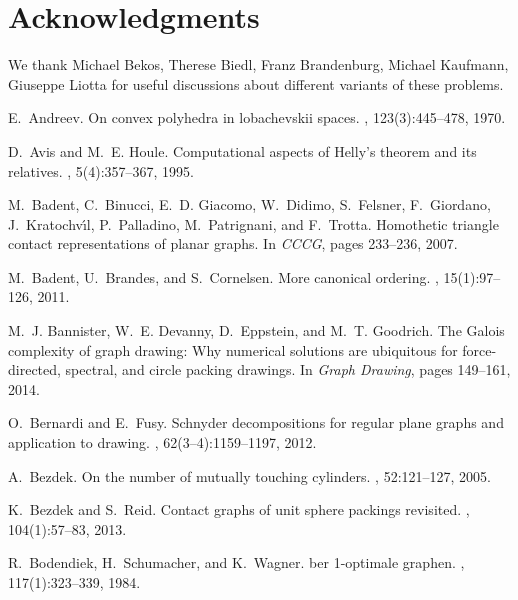 \documentclass{article}
\begin{document}
\section*{Acknowledgments}
We thank Michael Bekos, Therese Biedl, Franz Brandenburg, Michael Kaufmann, Giuseppe Liotta for useful discussions about different variants of these problems.





\begin{thebibliography}{10}

E.~Andreev.
\newblock On convex polyhedra in lobachevskii spaces.
, 123(3):445--478, 1970.

D.~Avis and M.~E. Houle.
\newblock Computational aspects of {H}elly's theorem and its relatives.
, 5(4):357--367, 1995.

M.~Badent, C.~Binucci, E.~D. Giacomo, W.~Didimo, S.~Felsner, F.~Giordano,
  J.~Kratochv{\'\i}l, P.~Palladino, M.~Patrignani, and F.~Trotta.
\newblock Homothetic triangle contact representations of planar graphs.
\newblock In {\em CCCG}, pages 233--236, 2007.

M.~Badent, U.~Brandes, and S.~Cornelsen.
\newblock More canonical ordering.
, 15(1):97--126,
  2011.

M.~J. Bannister, W.~E. Devanny, D.~Eppstein, and M.~T. Goodrich.
\newblock The {G}alois complexity of graph drawing: Why numerical solutions are
  ubiquitous for force-directed, spectral, and circle packing drawings.
\newblock In {\em Graph Drawing}, pages 149--161, 2014.

O.~Bernardi and E.~Fusy.
\newblock Schnyder decompositions for regular plane graphs and application to
  drawing.
, 62(3--4):1159--1197, 2012.

A.~Bezdek.
\newblock On the number of mutually touching cylinders.
, 52:121--127, 2005.

K.~Bezdek and S.~Reid.
\newblock Contact graphs of unit sphere packings revisited.
, 104(1):57--83, 2013.

R.~Bodendiek, H.~Schumacher, and K.~Wagner.
ber 1-optimale graphen.
, 117(1):323--339, 1984.


\end{thebibliography}
\end{document}
